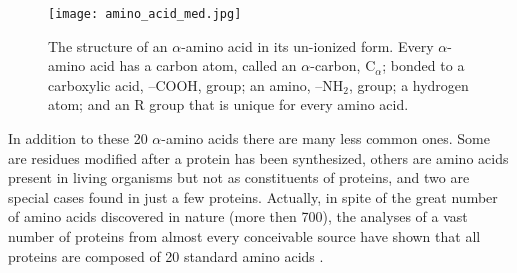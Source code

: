 \begin{figure}[h]
\centering
\begin{minipage}[t]{0.8\textwidth}
\centering
\texttt{[image: amino\_acid\_med.jpg]}

\caption{\small{The structure of an $\alpha$-amino acid in its un-ionized form. Every $\alpha$-amino acid has a carbon atom, called an $\alpha$-carbon, C$_\alpha$; bonded to a carboxylic acid, --COOH, group; an amino, --NH$_2$, group; a hydrogen atom; and an R group that is unique for every amino acid. %
}}

\label{fig:AminoAcid}
\end{minipage} 
\end{figure}

In addition to these 20 $\alpha$-amino acids there are many less common ones. Some are residues modified after a protein has been synthesized, others are amino acids present in living organisms but not as constituents of proteins, and two are special cases found in just a few proteins. Actually, in spite of the great number of amino acids discovered in nature (more then 700), the analyses of a vast number of proteins from almost every conceivable source have shown that all proteins are composed of 20 standard amino acids 
\cite{wu2013amino}.

